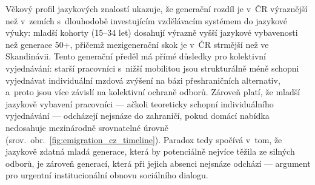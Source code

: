 Věkový profil jazykových znalostí ukazuje, že generační rozdíl je v~ČR výraznější než v~zemích s~dlouhodobě investujícím vzdělávacím systémem do jazykové výuky: mladší kohorty (15--34 let) dosahují výrazně vyšší jazykové vybavenosti než generace 50+, přičemž mezigenerační skok je v~ČR strmější než ve Skandinávii.
Tento generační předěl má přímé důsledky pro kolektivní vyjednávání: starší pracovníci s~nižší mobilitou jsou strukturálně méně schopni vyjednávat individuální mzdová zvýšení na bázi přeshraničních alternativ, a~proto jsou více závislí na kolektivní ochraně odborů.
Zároveň platí, že mladší jazykově vybavení pracovníci --- ačkoli teoreticky schopní individuálního vyjednávání --- odcházejí nejsnáze do zahraničí, pokud domácí nabídka nedosahuje mezinárodně srovnatelné úrovně (srov.~obr.~\ref{fig:emigration_cz_timeline}).
Paradox tedy spočívá v~tom, že jazykově zdatná mladá generace, která by potenciálně nejvíce těžila ze silných odborů, je zároveň generací, která při jejich absenci nejsnáze odchází --- argument pro urgentní institucionální obnovu sociálního dialogu.


